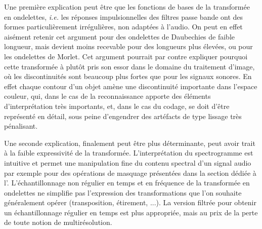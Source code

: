 Une première explication peut être que les fonctions de bases de la transformée en ondelettes, \textit{i.e.} les réponses impulsionnelles des filtres passe bande ont des formes particulièrement irrégulières, non adaptées à l'audio. On peut en effet aisément retenir cet argument pour des ondelettes de Daubechies de faible longueur, mais devient moins recevable pour des longueurs plus élevées, ou pour les ondelettes de Morlet. Cet argument pourrait par contre expliquer pourquoi cette transformée à plutôt pris son essor dans le domaine du traitement d'image, où les discontinuités sont beaucoup plus fortes que pour les signaux sonores. En effet chaque contour d'un objet amène une discontinuité importante dans l'espace couleur, qui, dans le cas de la reconnaissance apporte des éléments d'interprétation très importants, et, dans le cas du codage, se doit d'être représenté en détail, sous peine d'engendrer des artéfacts de type \og lissage \fg très pénalisant.

Une seconde explication, finalement peut être plus déterminante, peut avoir trait à la faible expressivité de la transformée. L'interprétation  du spectrogramme est intuitive et permet une manipulation fine du contenu spectral d'un signal audio par exemple pour des opérations de masquage présentées dans la section dédiée à l'. L'échantillonnage non régulier en temps et en fréquence de la transformée en ondelettes ne simplifie pas l'expression des transformations que l'on souhaite généralement opérer (transposition, étirement, ...). La version filtrée pour obtenir un échantillonnage régulier en temps est plus appropriée, mais au prix de la perte de toute notion de multirésolution.




